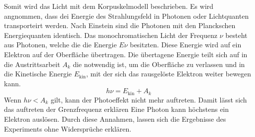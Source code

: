 Somit wird das Licht mit dem Korpuskelmodell beschrieben.
Es wird angnommen, dass dei Energie des Strahlungsfeld in Photonen oder Lichtquanten transporteirt werden.
Nach Einstein sind die Photonen mit den Planckschen Energiequanten identisch.
Das monochromatischen Licht der Frequenz $\nu$ besteht aus Photonen, welche die die Energie $E\nu$ besitzten.
Diese Energie wird auf ein Elektron auf der Oberfläche übertragen.
Die übertagene Energie teilt sich auf in die Austrittsarbeit $A_k$ die notwendig ist, um die Oberfläche zu verlassen und in die Kinetische Energie $E_\text{kin}$, mit der sich das rausgelöste Elektron weiter bewegen kann.
\begin{equation}
    h \nu = E_\text{kin} + A_k
\end{equation}
Wenn $h\nu < A_k$ gilt, kann der Photoeffekt nicht mehr auftreten.
Damit lässt sich das auftreten der Grenzfrequenz erklären  
Eine Photon kann höchstens ein Elektron auslösen.
Durch diese Annahmen, lassen sich die Ergebnisse des Experiments ohne Widersprüche erklären.


